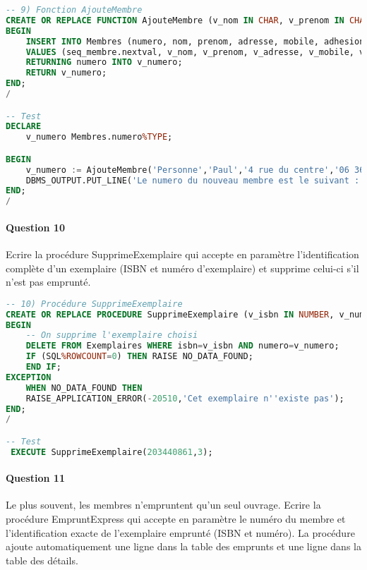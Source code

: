 \documentclass[10pt, oneside]{article}
\begin{document}
\begin{lstlisting}[language=sql, title=Question 9, label=QV9]
-- 9) Fonction AjouteMembre
CREATE OR REPLACE FUNCTION AjouteMembre (v_nom IN CHAR, v_prenom IN CHAR, v_adresse IN CHAR, v_mobile IN CHAR, v_adhesion IN DATE, v_duree IN NUMBER) RETURN NUMBER AS v_numero Membres.numero%TYPE;
BEGIN 
	INSERT INTO Membres (numero, nom, prenom, adresse, mobile, adhesion, duree)
	VALUES (seq_membre.nextval, v_nom, v_prenom, v_adresse, v_mobile, v_adhesion, v_duree)
	RETURNING numero INTO v_numero;
	RETURN v_numero;
END;
/

-- Test
DECLARE
	v_numero Membres.numero%TYPE;

BEGIN
	v_numero := AjouteMembre('Personne','Paul','4 rue du centre','06 36 65 65 65',sysdate,3);
	DBMS_OUTPUT.PUT_LINE('Le numero du nouveau membre est le suivant : '||v_numero);
END;
/
\end{lstlisting}


\paragraph{Question 10} Ecrire la procédure SupprimeExemplaire qui accepte en paramètre l'identification complète d'un exemplaire (ISBN et numéro d'exemplaire) et supprime celui-ci s'il n'est pas emprunté.

\begin{lstlisting}[language=sql, title=Question 10, label=QV10]
-- 10) Procédure SupprimeExemplaire
CREATE OR REPLACE PROCEDURE SupprimeExemplaire (v_isbn IN NUMBER, v_numero IN NUMBER) AS
BEGIN
	-- On supprime l'exemplaire choisi
	DELETE FROM Exemplaires WHERE isbn=v_isbn AND numero=v_numero;
	IF (SQL%ROWCOUNT=0) THEN RAISE NO_DATA_FOUND;
	END IF;
EXCEPTION
	WHEN NO_DATA_FOUND THEN
	RAISE_APPLICATION_ERROR(-20510,'Cet exemplaire n''existe pas');
END;
/

-- Test
 EXECUTE SupprimeExemplaire(203440861,3); 
\end{lstlisting}


\paragraph{Question 11} Le plus souvent, les membres n'empruntent qu'un seul ouvrage. Ecrire la procédure EmpruntExpress qui accepte en paramètre le numéro du membre et l'identification exacte de l'exemplaire emprunté (ISBN et numéro). La procédure ajoute automatiquement une ligne dans la table des emprunts et une ligne dans la table des détails.
\end{document}
